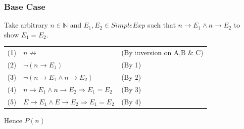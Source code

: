 \subsubsection{Base Case}
Take arbitrary $n \in \mathbb{N}$ and $E_1,E_2 \in SimpleExp$ such that $n \to E_1 \land n \to E_2$ to show $E_1 = E_2$.
\begin{center}
	\begin{tabular}{l l l}
		(1) & $n \not\to$                                       & (By inversion on A,B \& C) \\
		(2) & $\neg (n \to E_1)$                                & (By 1)                     \\
		(3) & $\neg (n \to E_1 \land n \to E_2)$                & (By 2)                     \\
		(4) & $n \to E_1 \land n \to E_2 \Rightarrow E_1 = E_2$ & (By 3)                     \\
		(5) & $E \to E_1 \land E \to E_2 \Rightarrow E_1 = E_2$ & (By 4)                     \\
	\end{tabular}
\end{center}
Hence $P(n)$
